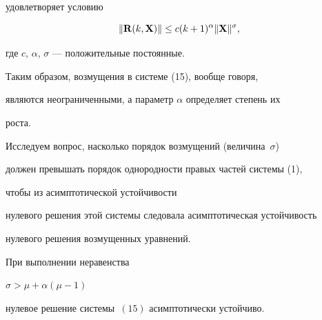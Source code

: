 удовлетворяет условию


\begin{equation}


\|\bold R(k,\bold X)\|\leq c (k+1)^\alpha \|\bold X\|^\sigma,


\end{equation}


где $c$, $\alpha$, $\sigma$ --- положительные постоянные.


Таким образом, возмущения в системе (15), вообще говоря, 


являются неограниченными, а параметр $\alpha$ определяет степень их


роста.





Исследуем вопрос, насколько порядок возмущений (величина~$\sigma$)


должен превышать порядок однородности правых частей системы (1),


чтобы из асимптотической устойчивости


нулевого решения этой системы следовала асимптотическая устойчивость


нулевого решения возмущенных уравнений.





\begin{thm}


При выполнении неравенства


$\sigma>\mu+\alpha(\mu-1)$


нулевое решение системы~$(15)$ асимптотически устойчиво.


\end{thm}





